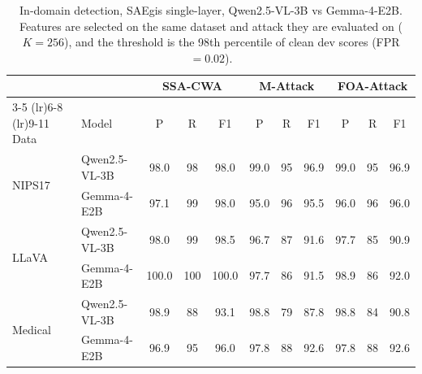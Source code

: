 \begin{table}[t]
\centering
\caption{In-domain detection, SAEgis single-layer, Qwen2.5-VL-3B vs Gemma-4-E2B. Features are selected on the same dataset and attack they are evaluated on ($K{=}256$), and the threshold is the 98th percentile of clean dev scores (FPR${=}0.02$).}
\label{tab:appendix-in-domain}
\begin{tabular}{llccccccccc}
\toprule
& & \multicolumn{3}{c}{SSA-CWA} & \multicolumn{3}{c}{M-Attack} & \multicolumn{3}{c}{FOA-Attack} \\
\cmidrule(lr){3-5} \cmidrule(lr){6-8} \cmidrule(lr){9-11}
Data & Model & P & R & F1 & P & R & F1 & P & R & F1 \\
\midrule
\multirow{2}{*}{NIPS17}
 & Qwen2.5-VL-3B & 98.0 & 98 & 98.0 & 99.0 & 95 & 96.9 & 99.0 & 95 & 96.9 \\
 & Gemma-4-E2B & 97.1 & 99 & 98.0 & 95.0 & 96 & 95.5 & 96.0 & 96 & 96.0 \\
\midrule
\multirow{2}{*}{LLaVA}
 & Qwen2.5-VL-3B & 98.0 & 99 & 98.5 & 96.7 & 87 & 91.6 & 97.7 & 85 & 90.9 \\
 & Gemma-4-E2B & 100.0 & 100 & 100.0 & 97.7 & 86 & 91.5 & 98.9 & 86 & 92.0 \\
\midrule
\multirow{2}{*}{Medical}
 & Qwen2.5-VL-3B & 98.9 & 88 & 93.1 & 98.8 & 79 & 87.8 & 98.8 & 84 & 90.8 \\
 & Gemma-4-E2B & 96.9 & 95 & 96.0 & 97.8 & 88 & 92.6 & 97.8 & 88 & 92.6 \\
\bottomrule
\end{tabular}
\end{table}

